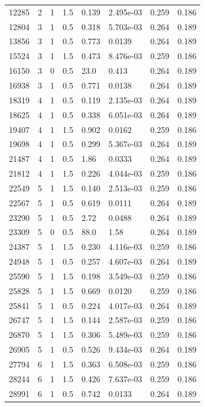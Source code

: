 \documentclass[preview]{standalone}
\begin{document}
{{\begin{tabular}{L{1.2cm}C{1.2cm} C{0.3cm}C{0.5cm} C{1.4cm}C{1.4cm} C{1.4cm}C{1.4cm}}
  12285  &     2  & 1     & 1.5 &  0.139  & 2.495e-03  & 0.259 &  0.186   \\ 
  12804  &     3  & 1     & 0.5 &  0.318  & 5.703e-03  & 0.264 &  0.189   \\ 
  13856  &     3  & 1     & 0.5 &  0.773  & 0.0139  & 0.264 &  0.189   \\ 
  15524  &     3  & 1     & 1.5 &  0.473  & 8.476e-03  & 0.259 &  0.186   \\ 
  16150  &     3  & 0     & 0.5 &  23.0  & 0.413  & 0.264 &  0.189   \\ 
  16938  &     3  & 1     & 0.5 &  0.771  & 0.0138  & 0.264 &  0.189   \\ 
  18319  &     4  & 1     & 0.5 &  0.119  & 2.135e-03  & 0.264 &  0.189   \\ 
  18625  &     4  & 1     & 0.5 &  0.338  & 6.051e-03  & 0.264 &  0.189   \\ 
  19407  &     4  & 1     & 1.5 &  0.902  & 0.0162  & 0.259 &  0.186   \\ 
  19698  &     4  & 1     & 0.5 &  0.299  & 5.367e-03  & 0.264 &  0.189   \\ 
  21487  &     4  & 1     & 0.5 &  1.86  & 0.0333  & 0.264 &  0.189   \\ 
  21812  &     4  & 1     & 1.5 &  0.226  & 4.044e-03  & 0.259 &  0.186   \\ 
  22549  &     5  & 1     & 1.5 &  0.140  & 2.513e-03  & 0.259 &  0.186   \\ 
  22567  &     5  & 1     & 0.5 &  0.619  & 0.0111  & 0.264 &  0.189   \\ 
  23290  &     5  & 1     & 0.5 &  2.72  & 0.0488  & 0.264 &  0.189   \\ 
  23309  &     5  & 0     & 0.5 &  88.0  & 1.58  & 0.264 &  0.189   \\ 
  24387  &     5  & 1     & 1.5 &  0.230  & 4.116e-03  & 0.259 &  0.186   \\ 
  24948  &     5  & 1     & 0.5 &  0.257  & 4.607e-03  & 0.264 &  0.189   \\ 
  25590  &     5  & 1     & 1.5 &  0.198  & 3.549e-03  & 0.259 &  0.186   \\ 
  25828  &     5  & 1     & 1.5 &  0.669  & 0.0120  & 0.259 &  0.186   \\ 
  25841  &     5  & 1     & 0.5 &  0.224  & 4.017e-03  & 0.264 &  0.189   \\ 
  26747  &     5  & 1     & 1.5 &  0.144  & 2.587e-03  & 0.259 &  0.186   \\ 
  26870  &     5  & 1     & 1.5 &  0.306  & 5.489e-03  & 0.259 &  0.186   \\ 
  26905  &     5  & 1     & 0.5 &  0.526  & 9.434e-03  & 0.264 &  0.189   \\ 
  27794  &     6  & 1     & 1.5 &  0.363  & 6.508e-03  & 0.259 &  0.186   \\ 
  28244  &     6  & 1     & 1.5 &  0.426  & 7.637e-03  & 0.259 &  0.186   \\ 
  28991  &     6  & 1     & 0.5 &  0.742  & 0.0133  & 0.264 &  0.189   \\ 
\hline 
\end{tabular} 

}}
\end{document}
